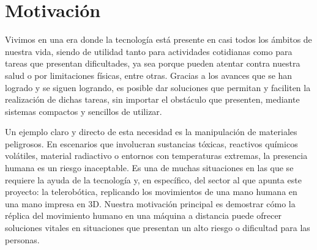 \section{Motivación}

Vivimos en una era donde la tecnología está presente en casi todos los ámbitos de nuestra vida, siendo de utilidad tanto para actividades cotidianas como para tareas que presentan dificultades, ya sea porque pueden atentar contra nuestra salud o por limitaciones físicas, entre otras. Gracias a los avances que se han logrado y se siguen logrando, es posible dar soluciones que permitan y faciliten la realización de dichas tareas, sin importar el obstáculo que presenten, mediante sistemas compactos y sencillos de utilizar.

Un ejemplo claro y directo de esta necesidad es la manipulación de materiales peligrosos. En escenarios que involucran sustancias tóxicas, reactivos químicos volátiles, material radiactivo o entornos con temperaturas extremas, la presencia humana es un riesgo inaceptable. Es una de muchas situaciones en las que se requiere la ayuda de la tecnología y, en específico, del sector al que apunta este proyecto: la telerobótica, replicando los movimientos de una mano humana en una mano impresa en 3D. Nuestra motivación principal es demostrar cómo la réplica del movimiento humano en una máquina a distancia puede ofrecer soluciones vitales en situaciones que presentan un alto riesgo o dificultad para las personas.
